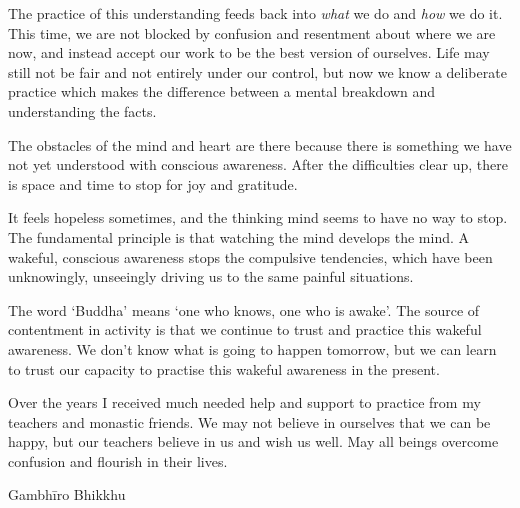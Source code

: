 The practice of this understanding feeds back into \emph{what} we do and
\emph{how} we do it. This time, we are not blocked by confusion and
resentment about where we are now, and instead accept our work to be the
best version of ourselves. Life may still not be fair and not entirely
under our control, but now we know a deliberate practice which makes the
difference between a mental breakdown and understanding the facts.

The obstacles of the mind and heart are there because there is something
we have not yet understood with conscious awareness. After the
difficulties clear up, there is space and time to stop for joy and
gratitude.

It feels hopeless sometimes, and the thinking mind seems to have no way
to stop. The fundamental principle is that watching the mind develops
the mind. A wakeful, conscious awareness stops the compulsive
tendencies, which have been unknowingly, unseeingly driving us to the
same painful situations.

The word `Buddha' means `one who knows, one who is awake'. The source of
contentment in activity is that we continue to trust and practice this
wakeful awareness. We don't know what is going to happen tomorrow, but
we can learn to trust our capacity to practise this wakeful awareness in
the present.

Over the years I received much needed help and support to practice from
my teachers and monastic friends. We may not believe in ourselves that
we can be happy, but our teachers believe in us and wish us well. May
all beings overcome confusion and flourish in their lives.

{%
  \raggedleft
  Gambhīro Bhikkhu
  \par%
}

